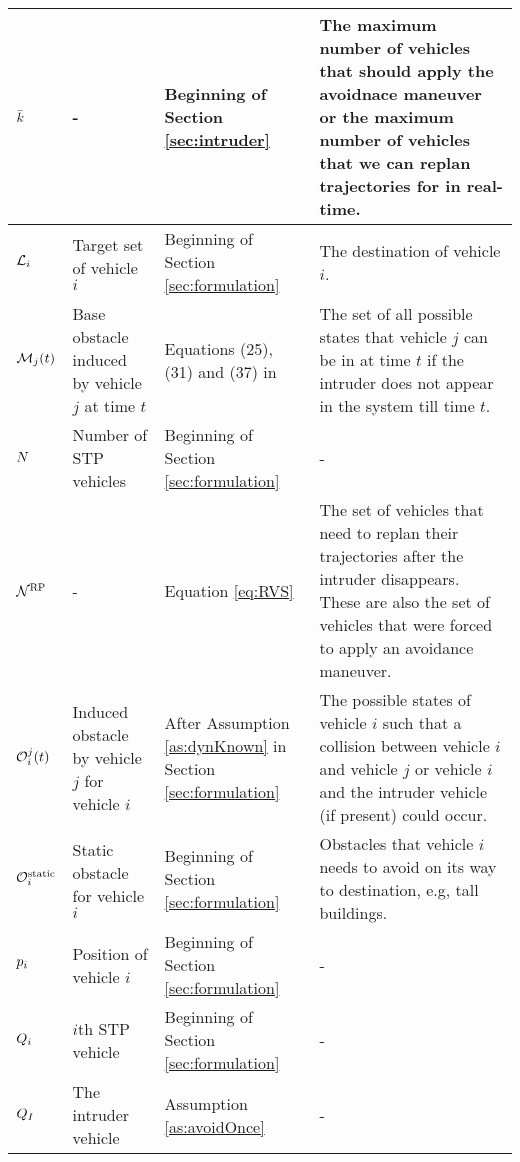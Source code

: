 \begin{table*}
{\begin{tabular}{ |>{\centering\arraybackslash}m{1.5cm}| m{5cm} | m{3cm} | m{\columnwidth} |}
    $\bar{k}$ & - & Beginning of Section \ref{sec:intruder} & The maximum number of vehicles that should apply the avoidnace maneuver or the maximum number of vehicles that we can replan trajectories for in real-time.    \\ \hline    
    
    $\mathcal{L}_i$ & Target set of vehicle $i$ & Beginning of Section \ref{sec:formulation} & The destination of vehicle $i$.    \\ \hline
    
    $\mathcal{M}_j(t)$ & Base obstacle induced by vehicle $j$ at time $t$ & Equations (25), (31) and (37) in \cite{chen2016robust} & The set of all possible states that vehicle $j$ can be in at time $t$ if the intruder does not appear in the system till time $t$. \\ \hline    
    
    $N$ & Number of STP vehicles & Beginning of Section \ref{sec:formulation} & -    \\ \hline
    $\mathcal{N}^\text{RP}$ & - & Equation \eqref{eq:RVS} & The set of vehicles that need to replan their trajectories after the intruder disappears. These are also the set of vehicles that were forced to apply an avoidance maneuver. \\ \hline
    
    
	$\mathcal{O}_i^j(t)$ & Induced obstacle by vehicle $j$ for vehicle $i$ & After Assumption \ref{as:dynKnown} in Section \ref{sec:formulation} & The possible states of vehicle $i$ such that a collision between vehicle $i$ and vehicle $j$ or vehicle $i$ and the intruder vehicle (if present) could occur.    \\ \hline 
    $\mathcal{O}^\text{static}_i$ & Static obstacle for vehicle $i$ & Beginning of Section \ref{sec:formulation} & Obstacles that vehicle $i$ needs to avoid on its way to destination, e.g, tall buildings. \\ \hline    
    
    $p_i$ & Position of vehicle $i$ & Beginning of Section \ref{sec:formulation} & -    \\ \hline
     
    $Q_{i}$ & $i$th STP vehicle & Beginning of Section \ref{sec:formulation} & -  \\ \hline
    $Q_{I}$ & The intruder vehicle & Assumption \ref{as:avoidOnce} & -  \\ \hline
    

\end{tabular}}
\end{table*}
